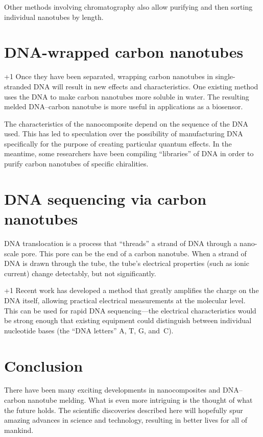 \documentclass[12pt]{article}
\begin{document}
Other methods involving chromatography also allow purifying and then sorting individual nanotubes by length.\cite{doi:10.1021/ac0508954}

\section{DNA-wrapped carbon nanotubes}

\looseness +1 Once they have been separated, wrapping carbon nanotubes in single-stranded DNA will result in new effects and characteristics.\cite{doi:10.1021/jp204017u}\cite{enyashin07} One existing method uses the DNA to make carbon nanotubes more soluble in water. The resulting melded DNA--carbon nanotube is more useful in applications as a biosensor.\cite{C1AN15179G}

The characteristics of the nanocomposite depend on the sequence of the DNA used.\cite{Zheng28112003} This has led to speculation over the possibility of manufacturing DNA specifically for the purpose of creating particular quantum effects. In the meantime, some researchers have been compiling ``libraries'' of DNA in order to purify carbon nanotubes of specific chiralities.\cite{tu09}

\section{DNA sequencing via carbon nanotubes}

DNA translocation is a process that ``threads'' a strand of DNA through a nano-scale pore.\cite{ISI:000168045700055} This pore can be the end of a carbon nanotube. When a strand of DNA is drawn through the tube, the tube's electrical properties (such as ionic current) change detectably, but not significantly.

\looseness +1 Recent work has developed a method that greatly amplifies the charge on the DNA itself, allowing practical electrical measurements at the molecular level.\cite{ISI:000273395400030} This can be used for rapid DNA sequencing---the electrical characteristics would be strong enough that existing equipment could distinguish between individual nucleotide bases (the ``DNA letters'' A, T, G, and~C).

\section*{Conclusion}

There have been many exciting developments in nanocomposites and DNA--carbon nanotube melding. What is even more intriguing is the thought of what the future holds. The scientific discoveries described here will hopefully spur amazing advances in science and technology, resulting in better lives for all of mankind.



\end{document}
